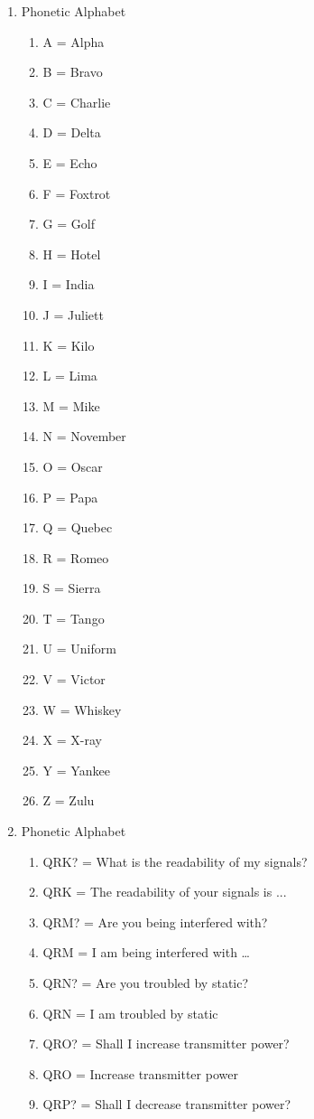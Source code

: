 \begin{enumerate}[noitemsep]
\item Phonetic Alphabet
\begin{enumerate}[noitemsep]
\item A = Alpha
\item B = Bravo
\item C = Charlie
\item D = Delta
\item E = Echo
\item F = Foxtrot
\item G = Golf
\item H = Hotel
\item I = India
\item J = Juliett
\item K = Kilo
\item L = Lima
\item M = Mike
\item N = November
\item O = Oscar
\item P = Papa
\item Q = Quebec
\item R = Romeo
\item S = Sierra
\item T = Tango
\item U = Uniform
\item V = Victor
\item W = Whiskey
\item X = X-ray
\item Y = Yankee
\item Z = Zulu
\end{enumerate}
\item Phonetic Alphabet
\begin{enumerate}[noitemsep]
\item QRK? = What is the readability of my signals?
\item QRK  = The readability of your signals is ...
\item QRM? = Are you being interfered with?
\item QRM  = I am being interfered with …
\item QRN? = Are you troubled by static?
\item QRN  = I am troubled by static
\item QRO? = Shall I increase transmitter power?
\item QRO  = Increase transmitter power
\item QRP? = Shall I decrease transmitter power?

\end{enumerate}
\end{enumerate}
